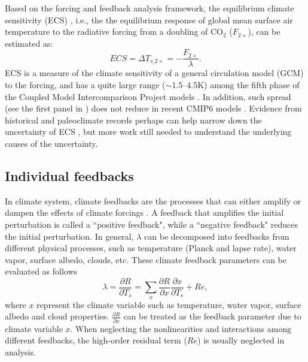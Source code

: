 Based on the forcing and feedback analysis framework, the equilibrium climate sensitivity (ECS) , i.e., the the equilibrium response of global mean surface air temperature to the radiative forcing from a doubling of CO$_2$ ($F_{2\times}$), can be estimated as:
\begin{equation}
    ECS = \Delta T_{s\_2\times}=-\frac{F_{2\times}}{\lambda}.
    \label{eq:ecs}
\end{equation}
ECS is a measure of the climate sensitivity of a general circulation model (GCM) to the forcing, and has a quite large range ($\sim$1.5--4.5K) among the fifth phase of the Coupled Model Intercomparison Project \citep[CMIP5;][]{Taylor2012overview} models \citep[e.g.,][]{Andrews2012forcing,Ceppi2017}. In addition, such spread (see the first panel in ) does not reduce in recent CMIP6 \citep{Eyring2016overview} models  \citep{Zelinka2020causes}. Evidence from historical and paleoclimate records perhaps can help narrow down the uncertainty of ECS \citep{Sherwood2020}, but more work still needed to understand the underlying causes of the uncertainty.

\subsection{Individual feedbacks}
\label{sec:individual_fbks}

In climate system, climate feedbacks are the processes that can either amplify or dampen the effects of climate forcings \citep{Hansen1984}. A feedback that amplifies the initial perturbation is called a ``positive feedback", while a ``negative feedback" reduces the initial perturbation. In general, $\lambda$ can be decomposed into feedbacks from different physical processes, such as temperature (Planck and lapse rate), water vapor, surface albedo, clouds, etc. These climate feedback parameters can be evaluated as follows
\begin{equation}
    \lambda = \frac{\partial R}{\partial T_s} = \sum_x \frac{\partial R}{\partial x}\frac{\partial x}{\partial T_s} + Re, %
    \label{eq:lambda_sum}
\end{equation}
where $x$ represent the climate variable such as temperature, water vapor, surface albedo and cloud properties. $\frac{\partial R}{\partial x}$ can be treated as the feedback parameter due to climate variable $x$. When neglecting the nonlinearities and interactions among different feedbacks, the high-order residual term ($Re$) is usually neglected in analysis. 

